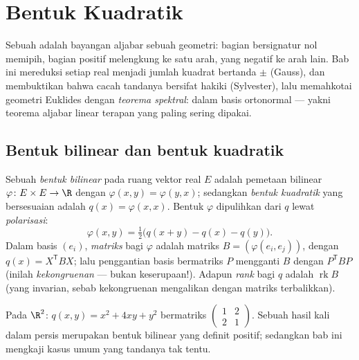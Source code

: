 \chapter{Bentuk Kuadratik}\label{ch:b2:quadratic}

Sebuah  adalah bayangan aljabar sebuah geometri: bagian
bersignatur nol memipih, bagian positif melengkung ke satu arah, yang
negatif ke arah lain. Bab ini mereduksi setiap  real
menjadi jumlah kuadrat bertanda $\pm$ (Gauss), dan membuktikan bahwa cacah
tandanya bersifat hakiki (Sylvester), lalu memahkotai geometri Euklides
dengan \emph{teorema spektral}:   dalam basis ortonormal --- yakni teorema aljabar linear
terapan yang paling sering dipakai.

\section{Bentuk bilinear dan bentuk kuadratik}

\begin{definition}\label{def:b2:quadratic:def}
Sebuah \emph{bentuk bilinear } pada ruang vektor real $E$ adalah
pemetaan bilinear $\varphi \colon E \times E \to \R$ dengan $\varphi(x, y) =
\varphi(y, x)$; sedangkan \emph{bentuk kuadratik}
yang bersesuaian adalah $q(x) = \varphi(x, x)$. Bentuk
$\varphi$ dipulihkan dari $q$ lewat
\emph{polarisasi}:
\[
\varphi(x, y) = \tfrac12\bigl(q(x + y) - q(x) - q(y)\bigr).
\]
Dalam basis $(e_i)$, \emph{matriks} bagi $\varphi$ adalah matriks
 $B = (\varphi(e_i, e_j))$, dengan $q(x) = X^{\mathsf T} B X$;
lalu penggantian basis bermatriks $P$ mengganti $B$ dengan $P^{\mathsf T} B P$
(inilah \emph{kekongruenan} --- bukan
keserupaan!). Adapun \emph{rank} bagi $q$ adalah $\operatorname{rk} B$
(yang invarian, sebab kekongruenan mengalikan dengan matriks terbalikkan).
\end{definition}

\begin{example}
Pada $\R^2$: $q(x, y) = x^2 + 4xy + y^2$ bermatriks $\begin{pmatrix}
1 & 2\\ 2 & 1\end{pmatrix}$. Sebuah hasil kali dalam persis merupakan
bentuk bilinear  yang  definit positif;
sedangkan bab ini mengkaji kasus umum yang tandanya tak tentu.
\end{example}

